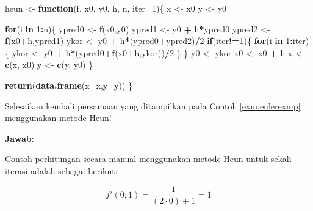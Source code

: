 \documentclass[]{book}
\newenvironment{Shaded}{\begin{snugshade}}{\end{snugshade}}
\newcommand{\ControlFlowTok}[1]{\textcolor[rgb]{0.13,0.29,0.53}{\textbf{#1}}}
\newcommand{\DataTypeTok}[1]{\textcolor[rgb]{0.13,0.29,0.53}{#1}}
\newcommand{\DecValTok}[1]{\textcolor[rgb]{0.00,0.00,0.81}{#1}}
\newcommand{\KeywordTok}[1]{\textcolor[rgb]{0.13,0.29,0.53}{\textbf{#1}}}
\newcommand{\NormalTok}[1]{#1}
\newcommand{\OperatorTok}[1]{\textcolor[rgb]{0.81,0.36,0.00}{\textbf{#1}}}
\newcommand{\StringTok}[1]{\textcolor[rgb]{0.31,0.60,0.02}{#1}}
\theoremstyle{definition}
\theoremstyle{definition}
\theoremstyle{definition}
\theoremstyle{remark}
\let\BeginKnitrBlock\begin \let\EndKnitrBlock\end
\begin{document}
\begin{Shaded}
\begin{Highlighting}[]
\NormalTok{heun <-}\StringTok{ }\ControlFlowTok{function}\NormalTok{(f, x0, y0, h, n, }\DataTypeTok{iter=}\DecValTok{1}\NormalTok{)\{}
\NormalTok{  x <-}\StringTok{ }\NormalTok{x0}
\NormalTok{  y <-}\StringTok{ }\NormalTok{y0}
  
  \ControlFlowTok{for}\NormalTok{(i }\ControlFlowTok{in} \DecValTok{1}\OperatorTok{:}\NormalTok{n)\{}
\NormalTok{    ypred0 <-}\StringTok{ }\KeywordTok{f}\NormalTok{(x0,y0)}
\NormalTok{    ypred1 <-}\StringTok{ }\NormalTok{y0 }\OperatorTok{+}\StringTok{ }\NormalTok{h}\OperatorTok{*}\NormalTok{ypred0}
\NormalTok{    ypred2 <-}\StringTok{ }\KeywordTok{f}\NormalTok{(x0}\OperatorTok{+}\NormalTok{h,ypred1)}
\NormalTok{    ykor <-}\StringTok{ }\NormalTok{y0 }\OperatorTok{+}\StringTok{ }\NormalTok{h}\OperatorTok{*}\NormalTok{(ypred0}\OperatorTok{+}\NormalTok{ypred2)}\OperatorTok{/}\DecValTok{2}
    \ControlFlowTok{if}\NormalTok{(iter}\OperatorTok{!=}\DecValTok{1}\NormalTok{)\{}
      \ControlFlowTok{for}\NormalTok{(i }\ControlFlowTok{in} \DecValTok{1}\OperatorTok{:}\NormalTok{iter)\{}
\NormalTok{        ykor <-}\StringTok{ }\NormalTok{y0 }\OperatorTok{+}\StringTok{ }\NormalTok{h}\OperatorTok{*}\NormalTok{(ypred0}\OperatorTok{+}\KeywordTok{f}\NormalTok{(x0}\OperatorTok{+}\NormalTok{h,ykor))}\OperatorTok{/}\DecValTok{2}
\NormalTok{      \}}
\NormalTok{    \}}
\NormalTok{    y0 <-}\StringTok{ }\NormalTok{ykor}
\NormalTok{    x0 <-}\StringTok{ }\NormalTok{x0 }\OperatorTok{+}\StringTok{ }\NormalTok{h}
\NormalTok{    x <-}\StringTok{ }\KeywordTok{c}\NormalTok{(x, x0)}
\NormalTok{    y <-}\StringTok{ }\KeywordTok{c}\NormalTok{(y, y0)}
\NormalTok{  \}}
  
  \KeywordTok{return}\NormalTok{(}\KeywordTok{data.frame}\NormalTok{(}\DataTypeTok{x=}\NormalTok{x,}\DataTypeTok{y=}\NormalTok{y))}
\NormalTok{\}}
\end{Highlighting}
\end{Shaded}

\BeginKnitrBlock{example}
\protect\hypertarget{exm:heunexmp}{}{\label{exm:heunexmp} }Selesaikan kembali persamaan yang ditampilkan pada Contoh \ref{exm:eulerexmp} menggunakan metode Heun!
\EndKnitrBlock{example}

\textbf{Jawab}:

Contoh perhitungan secara manual menggunakan metode Heun untuk sekali iterasi adalah sebagai berikut:

\[
f'\left(0;1\right)=\frac{1}{\left(2\cdot 0\right)+1}=1
\]
\end{document}
